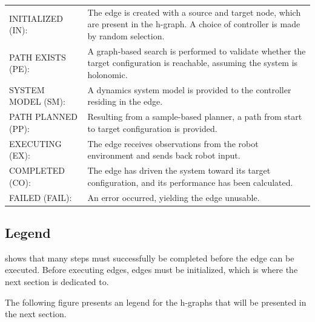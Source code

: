 \noindent
\begin{table}[H]
\centering
\begin{tabular}%
  {>{\raggedleft\arraybackslash}p{}%
   >{\raggedright\arraybackslash}p{}}
INITIALIZED (IN): & The edge is created with a source and target node, which are present in the \ac{h-graph}. A choice of controller is made by random selection. \\
PATH EXISTS (PE): & A graph-based search is performed to validate whether the target configuration is reachable, assuming the system is holonomic. \\
SYSTEM MODEL (SM): & A dynamics system model is provided to the controller residing in the edge. \\
PATH PLANNED (PP): & Resulting from a sample-based planner, a path from start to target configuration is provided. \\
EXECUTING (EX): & The edge receives observations from the robot environment and sends back robot input. \\
COMPLETED (CO): & The edge has driven the system toward its target configuration, and its performance has been calculated. \\
FAILED (FAIL): & An error occurred, yielding the edge unusable. \\
\end{tabular}
\end{table}


\subsection{Legend}

 shows that many steps must successfully be completed before the edge can be executed.
Before executing edges, edges must be initialized, which is where the next section is dedicated to.\bs

The following figure presents an legend for the \ac{h-graph}s that will be presented in the next section.\bs

